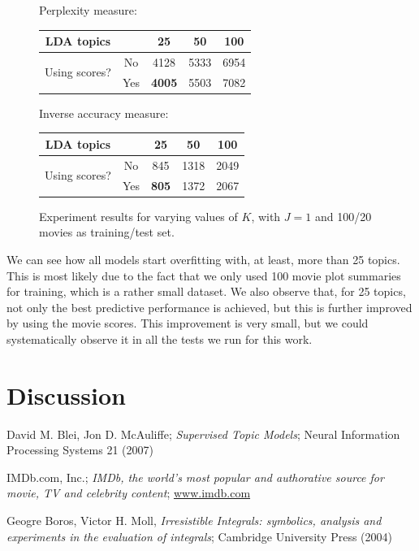 \documentclass[a4paper,10pt]{article}
\begin{document}
\begin{figure}[ht!]
	Perplexity measure:
	
	\begin{center}
	\begin{tabular}{cc|ccc}
		LDA topics      & & 25 & 50 & 100 \\ \hline
		\multirow{2}{*}{Using scores?} & No  & 4128 & 5333 & 6954 \\
		                               & Yes & \textbf{4005} & 5503 & 7082 \\
	\end{tabular}
	\end{center}
	
	Inverse accuracy measure:
	
	\begin{center}
	\begin{tabular}{cc|ccc}
		LDA topics      & & 25 & 50 & 100 \\ \hline
		\multirow{2}{*}{Using scores?} & No  & 845 & 1318 & 2049 \\
		                               & Yes & \textbf{805} & 1372 & 2067 \\
	\end{tabular}
	\end{center}
\caption{Experiment results for varying values of $K$, with $J=1$ and 100/20 movies as training/test set.}
\label{figure:K}
\end{figure}

We can see how all models start overfitting with, at least, more than 25 topics.
This is most likely due to the fact that we only used 100 movie plot summaries for training, which is a rather small dataset. 
We also observe that, for 25 topics, not only the best predictive performance is achieved, but this is further improved by using the movie scores.
This improvement is very small, but we could systematically observe it in all the tests we run for this work. 

\section{Discussion}

\begin{thebibliography}{9}
  David M. Blei, Jon D. McAuliffe;
  \emph{Supervised Topic Models};
  Neural Information Processing Systems 21 (2007)
  
  IMDb.com, Inc.; 
  \emph{IMDb, the world's most popular and authorative source for movie, TV and celebrity content};
  \url{www.imdb.com}

  Geogre Boros, Victor H. Moll,
  \emph{Irresistible Integrals: symbolics, analysis and experiments in the evaluation of integrals};
  Cambridge University Press (2004)

\end{thebibliography}
\end{document}
